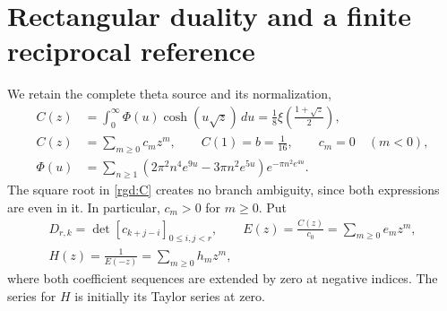 
\section{Rectangular duality and a finite reciprocal reference}
\label{rgd:sec-reciprocal}

We retain the complete theta source and its normalization,
\begin{align}
 C(z)&=\int_0^\infty\Phi(u)\cosh(u\sqrt z)\,du
      =\frac18\xi\!\left(\frac{1+\sqrt z}{2}\right),
                                                               \label{rgd:C}\\
 C(z)&=\sum_{m\ge0}c_mz^m,\qquad C(1)=b=\frac1{16},
       \qquad c_m=0\quad(m<0),\nonumber\\
 \Phi(u)&=\sum_{n\ge1}
 (2\pi^2n^4e^{9u}-3\pi n^2e^{5u})e^{-\pi n^2e^{4u}}.
                                                               \label{rgd:source}
\end{align}
The square root in \eqref{rgd:C} creates no branch ambiguity, since
both expressions are even in it.  In particular, $c_m>0$ for $m\ge0$.
Put
\[
 \begin{gathered}
 D_{r,k}=\det[c_{k+j-i}]_{0\le i,j<r},\qquad
 E(z)=\frac{C(z)}{c_0}=\sum_{m\ge0}e_mz^m,\\
 H(z)=\frac1{E(-z)}=\sum_{m\ge0}h_mz^m,
 \end{gathered}
\]
where both coefficient sequences are extended by zero at negative indices.
The series for $H$ is initially its Taylor series at zero.

